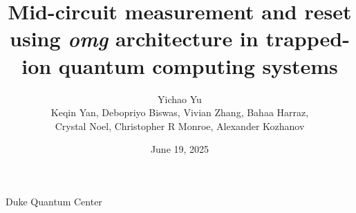 \documentclass{beamer}
\title[MCMR with \textit{omg}]{Mid-circuit measurement and reset using \textit{omg} architecture in trapped-ion quantum computing systems}
\date{June 19, 2025}
\author[Yichao Yu]{Yichao Yu\\
  \vspace{0.5cm}
  {\footnotesize Keqin Yan, Debopriyo Biswas, Vivian Zhang, Bahaa Harraz,}\\
  {\footnotesize Crystal Noel, Christopher R Monroe, Alexander Kozhanov}}
\institute[Duke Quantum Center]{Monroe Group/Duke Quantum Center}
\begin{document}


{
  \begin{frame}{}
    \titlepage
  \end{frame}
}


\begin{frame}{Duke Quantum Center}
  \begin{center}
    \begin{tikzpicture}
    \end{tikzpicture}
  \end{center}
\end{frame}


\end{document}
